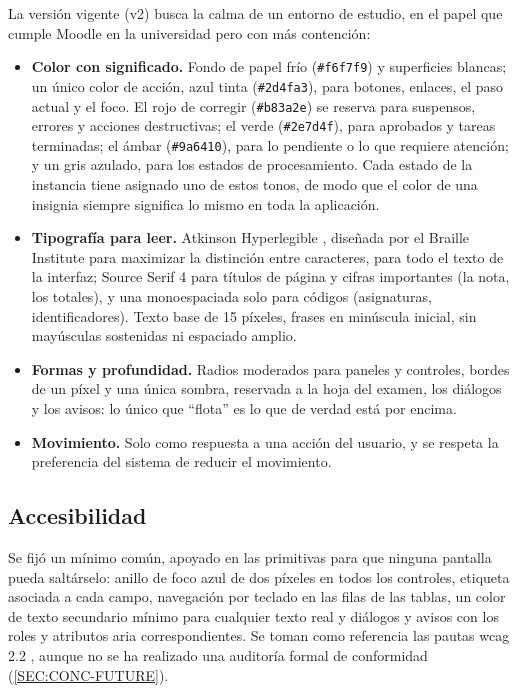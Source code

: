 La versión vigente (v2) busca la calma de un entorno de estudio, en el papel que cumple
Moodle en la universidad pero con más contención:
\begin{itemize}
  \item \textbf{Color con significado.} Fondo de papel frío (\texttt{\#f6f7f9}) y
        superficies blancas; un único color de acción, azul tinta (\texttt{\#2d4fa3}),
        para botones, enlaces, el paso actual y el foco. El rojo de corregir
        (\texttt{\#b83a2e}) se reserva para suspensos, errores y acciones destructivas; el
        verde (\texttt{\#2e7d4f}), para aprobados y tareas terminadas; el ámbar
        (\texttt{\#9a6410}), para lo pendiente o lo que requiere atención; y un gris
        azulado, para los estados de procesamiento. Cada estado de la instancia tiene
        asignado uno de estos tonos, de modo que el color de una insignia siempre significa
        lo mismo en toda la aplicación.
  \item \textbf{Tipografía para leer.} Atkinson Hyperlegible \cite{atkinson_hyperlegible},
        diseñada por el Braille Institute para maximizar la distinción entre caracteres,
        para todo el texto de la interfaz; Source Serif 4 para títulos de página y cifras
        importantes (la nota, los totales), y una monoespaciada solo para códigos
        (asignaturas, identificadores). Texto base de 15 píxeles, frases en minúscula
        inicial, sin mayúsculas sostenidas ni espaciado amplio.
  \item \textbf{Formas y profundidad.} Radios moderados para paneles y controles, bordes de
        un píxel y una única sombra, reservada a la hoja del examen, los diálogos y los
        avisos: lo único que ``flota'' es lo que de verdad está por encima.
  \item \textbf{Movimiento.} Solo como respuesta a una acción del usuario, y se respeta la
        preferencia del sistema de reducir el movimiento.
\end{itemize}

\subsection{Accesibilidad}

Se fijó un mínimo común, apoyado en las primitivas para que ninguna pantalla pueda
saltárselo: anillo de foco azul de dos píxeles en todos los controles, etiqueta asociada a
cada campo, navegación por teclado en las filas de las tablas, un color de texto secundario
mínimo para cualquier texto real y diálogos y avisos con los roles y atributos
\acs{aria} correspondientes. Se toman como referencia las pautas \acs{wcag} 2.2
\cite{wcag22}, aunque no se ha realizado una auditoría formal de conformidad
(\cref{SEC:CONC-FUTURE}).

